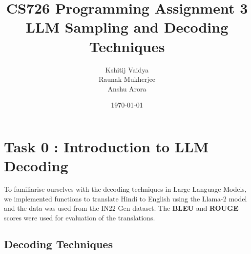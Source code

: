 \documentclass[12pt]{article}
\begin{document}
\title{CS726 Programming Assignment 3 \\ LLM Sampling and Decoding Techniques}
\author{Kshitij Vaidya \\ Raunak Mukherjee \\ Anshu Arora}
\date{\today}
\maketitle

\tableofcontents
\clearpage

\section{Task 0 : Introduction to LLM Decoding}

To familiarise ourselves with the decoding techniques in Large Language Models, we implemented functions to translate Hindi to English using the Llama-2 model and the data was used from the IN22-Gen dataset. The \textbf{BLEU} and \textbf{ROUGE} scores were used for evaluation of the translations.

\subsection{Decoding Techniques} 
\end{document}
